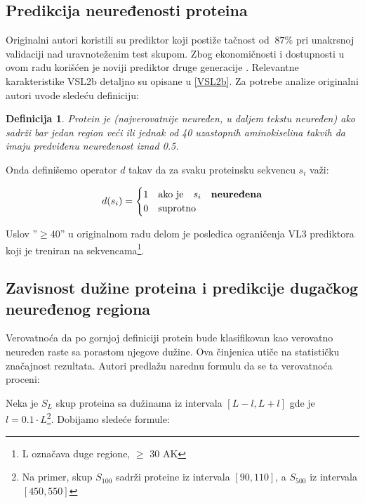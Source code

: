 \subsection{Predikcija neuređenosti proteina}
\label{naredno}

Originalni autori koristili su  prediktor koji
postiže tačnost od $~87\%$ pri unakrsnoj validaciji nad uravnoteženim test
skupom.  Zbog ekonomičnosti i dostupnosti u ovom radu korišćen je noviji
prediktor druge generacije .
Relevantne karakteristike VSL2b detaljno su opisane u \ref{VSL2b}.
Za potrebe analize originalni autori  uvode sledeću definiciju:

\newtheorem{mydef}{Definicija}
\begin{mydef}
\label{pdis_def}
Protein je  (najverovatnije neuređen, u daljem tekstu neuređen) 
ako sadrži bar jedan region veći ili jednak od 40 uzastopnih aminokiselina
takvih da imaju \textit{predviđenu neuređenost} iznad 0.5. 
\end{mydef}

Onda definišemo operator $d$ takav da za svaku proteinsku sekvencu $s_i$ važi:

\[   
  d(s_i) = 
    \begin{cases}
      1 & \text{ako je} \quad s_i \quad \textbf{neuređena}\\
      0 & \text{suprotno}
    \end{cases}
\]

Uslov ''$\ge40$'' u originalnom radu delom je posledica ograničenja VL3
prediktora koji je treniran na  sekvencama\footnote{L označava
duge regione, $\ge$ 30 AK}.

\subsection{Zavisnost dužine proteina i predikcije dugačkog neuređenog regiona}

Verovatnoća da po gornjoj definiciji protein bude klasifikovan kao verovatno
neuređen raste sa porastom njegove dužine. Ova činjenica  utiče
na statističku značajnost rezultata. Autori \parencite{Xie2007} 
predlažu narednu formulu da se ta verovatnoća proceni:

Neka je $S_L$ skup proteina sa dužinama iz intervala $[L-l, L+l]$ gde je $l
= 0.1 \cdot L$\footnote{Na primer, skup $S_{100}$ sadrži proteine iz intervala $[90, 110]$, a $S_{500}$ iz intervala $[450, 550]$}.
Dobijamo sledeće formule:

